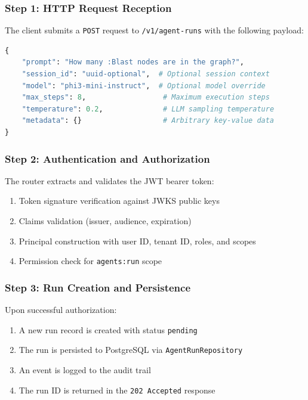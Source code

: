 \subsubsection{Step 1: HTTP Request Reception}

The client submits a \texttt{POST} request to \texttt{/v1/agent-runs} with the following payload:

\begin{lstlisting}[language=Python, caption={Agent run request payload}, label=lst:run-request]
{
    "prompt": "How many :Blast nodes are in the graph?",
    "session_id": "uuid-optional",  # Optional session context
    "model": "phi3-mini-instruct",  # Optional model override
    "max_steps": 8,                  # Maximum execution steps
    "temperature": 0.2,              # LLM sampling temperature
    "metadata": {}                   # Arbitrary key-value data
}
\end{lstlisting}

\subsubsection{Step 2: Authentication and Authorization}

The router extracts and validates the JWT bearer token:

\begin{enumerate}
    \item Token signature verification against JWKS public keys
    \item Claims validation (issuer, audience, expiration)
    \item Principal construction with user ID, tenant ID, roles, and scopes
    \item Permission check for \texttt{agents:run} scope
\end{enumerate}

\subsubsection{Step 3: Run Creation and Persistence}

Upon successful authorization:

\begin{enumerate}
    \item A new run record is created with status \texttt{pending}
    \item The run is persisted to PostgreSQL via \texttt{AgentRunRepository}
    \item An event is logged to the audit trail
    \item The run ID is returned in the \texttt{202 Accepted} response
\end{enumerate}

